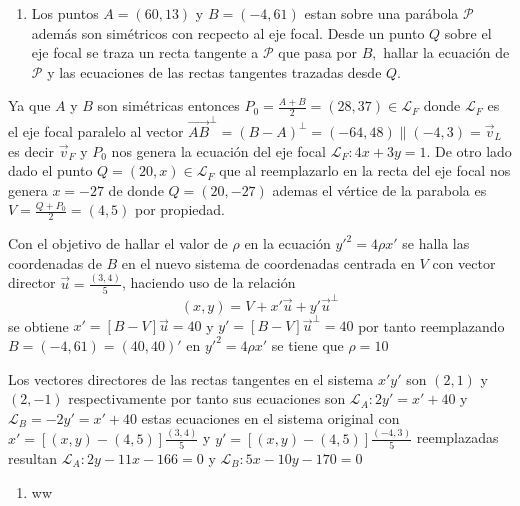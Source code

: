 \documentclass[12pt,]{report}
\providecommand{\tightlist}{%
  \setlength{\itemsep}{0pt}\setlength{\parskip}{0pt}}
\begin{document}
\begin{enumerate}
\def\labelenumi{\arabic{enumi}.}
\setcounter{enumi}{1}
\tightlist
\item
  Los puntos \(A=(60,13)\) y \(B=(-4,61)\) estan sobre una parábola \(\mathcal{P}\) además son simétricos con recpecto al eje focal. Desde un punto \(Q\) sobre el eje focal se traza un recta tangente a \(\mathcal{P}\) que pasa por \(B,\) hallar la ecuación de \(\mathcal{P}\) y las ecuaciones de las rectas tangentes trazadas desde \(Q\).
\end{enumerate}

Ya que \(A\) y \(B\) son simétricas entonces \(P_0=\frac{A+B}{2}=(28,37) \in \mathcal{L}_F\) donde \(\mathcal{L}_F\) es el eje focal paralelo al vector \(\vec{AB}^\perp=(B-A)^\perp=(-64,48)\parallel(-4,3)=\vec{v}_L\) es decir \(\vec{v}_F\) y \(P_0\) nos genera la ecuación del eje focal \(\mathcal{L}_F:4x+3y=1\). De otro lado dado el punto \(Q=(20,x)\in\mathcal{L}_F\) que al reemplazarlo en la recta del eje focal nos genera \(x=-27\) de donde \(Q=(20,-27)\) ademas el vértice de la parabola es \(V=\frac{Q+P_0}{2}=(4,5)\) por propiedad.

Con el objetivo de hallar el valor de \(\rho\) en la ecuación \(y'^2=4\rho x'\) se halla las coordenadas de \(B\) en el nuevo sistema de coordenadas centrada en \(V\) con vector director \(\vec{u}=\frac{(3,4)}{5}\), haciendo uso de la relación \[(x,y)=V+x'\vec{u}+y'\vec{u}^\perp\] se obtiene \(x'=\left[B-V\right]\vec{u}=40\) y \(y'=\left[B-V\right]\vec{u}^\perp=40\) por tanto reemplazando \(B=(-4,61)=(40,40)'\) en \(y'^2=4\rho x'\) se tiene que \(\rho=10\)

Los vectores directores de las rectas tangentes en el sistema \(x'y'\) son \((2,1)\) y \((2,-1)\) respectivamente por tanto sus ecuaciones son \(\mathcal{L}_A: 2y'=x'+40\) y \(\mathcal{L}_B=-2y'=x'+40\) estas ecuaciones en el sistema original con \(x'=\left[(x,y)-(4,5)\right]\frac{(3,4)}{5}\) y \(y'=\left[(x,y)-(4,5)\right]\frac{(-4,3)}{5}\) reemplazadas resultan \(\mathcal{L}_A:2y-11x-166=0\) y \(\mathcal{L}_B:5x-10y-170=0\)

\begin{enumerate}
\def\labelenumi{\arabic{enumi}.}
\tightlist
\item
  ww
\end{enumerate}


\end{document}
